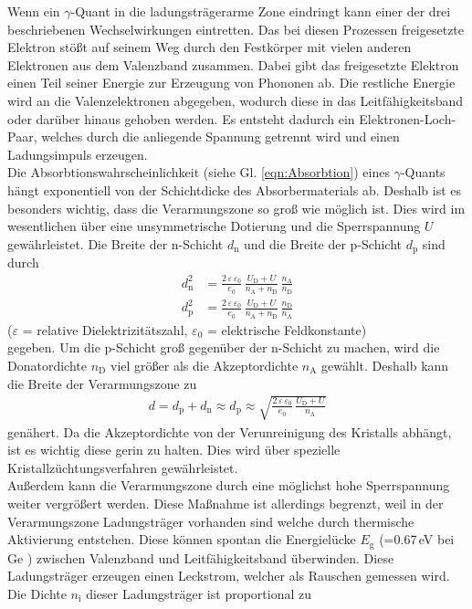 Wenn ein $\gamma$-Quant in die ladungsträgerarme Zone eindringt kann einer der drei beschriebenen Wechselwirkungen eintretten. Das bei diesen Prozessen freigesetzte Elektron stößt auf seinem Weg durch den Festkörper mit vielen anderen Elektronen aus dem Valenzband zusammen. Dabei gibt das freigesetzte Elektron einen Teil seiner Energie zur Erzeugung von Phononen ab. Die restliche Energie wird an die Valenzelektronen abgegeben, wodurch diese in das Leitfähigkeitsband oder darüber hinaus gehoben werden. Es entsteht dadurch ein Elektronen-Loch-Paar, welches durch die anliegende Spannung getrennt wird und einen Ladungsimpuls erzeugen. \\
Die Absorbtionswahrscheinlichkeit (siehe Gl. \eqref{eqn:Absorbtion}) eines $\gamma$-Quants hängt exponentiell von der Schichtdicke des Absorbermaterials ab. Deshalb ist es besonders wichtig, dass die Verarmungszone so groß wie möglich ist. Dies wird im wesentlichen über eine unsymmetrische Dotierung und die Sperrspannung $U$ gewährleistet. Die Breite der n-Schicht $d_\text{n}$ und die Breite der p-Schicht $d_\text{p}$ sind durch
\begin{align}
	d_\text{n}^2 &= \frac{2\,\varepsilon\,\varepsilon_0} {e_0} \, \frac{U_\text{D} + U}{n_\text{A} + n_\text{D}} \, \frac{n_\text{A}}{n_\text{D}} \\
	d_\text{p}^2 &= \frac{2\,\varepsilon\,\varepsilon_0} {e_0} \, \frac{U_\text{D} + U} {n_\text{A} + n_\text{D}} \, \frac{n_\text{D}}{n_\text{A}}
\end{align}
\hfil {\footnotesize($\varepsilon$ = relative Dielektrizitätszahl, $\varepsilon_0$ = elektrische Feldkonstante)} \hfil \\
gegeben. Um die p-Schicht groß gegenüber der n-Schicht zu machen, wird die Donatordichte $n_\text{D}$ viel größer als die Akzeptordichte $n_\text{A}$ gewählt. Deshalb kann die Breite der Verarmungszone zu
\begin{align}
	d = d_\text{p} + d_\text{n} \approx d_\text{p} \approx \sqrt{\frac{2\,\varepsilon\,\varepsilon_0} {e_0} \, \frac{U_\text{D} + U}{n_\text{A}}}
\end{align}
genähert. Da die Akzeptordichte von der Verunreinigung des Kristalls abhängt, ist es wichtig diese gerin zu halten. Dies wird über spezielle Kristallzüchtungsverfahren gewährleistet. \\
Außerdem kann die Verarmungszone durch eine möglichst hohe Sperrspannung weiter vergrößert werden. Diese Maßnahme ist allerdings begrenzt, weil in der Verarmungszone Ladungsträger vorhanden sind welche durch thermische Aktivierung entstehen. Diese können spontan die Energielücke $E_\text{g}$ (=0.67\,eV bei Ge \cite[13]{V18}) zwischen Valenzband und Leitfähigkeitsband überwinden. Diese Ladungsträger erzeugen einen Leckstrom, welcher als Rauschen gemessen wird. Die Dichte $n_\text{i}$ dieser Ladungsträger ist proportional zu
